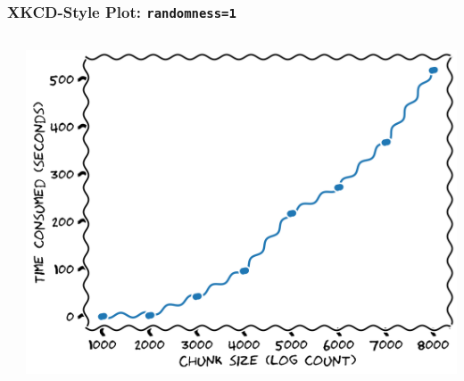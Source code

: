 \documentclass[xcolor={svgnames}]{beamer}
\newcommand{\pyfile}[2][]{}
\begin{document}
\begin{frame}[t,fragile]
    \frametitle{XKCD-Style Plot: \texttt{randomness=1}}
    \vspace{-2mm}
    \begin{columns}[T]
        \begin{column}{0.49\textwidth}
            \pyfile[style=footnotesize]{examples/xkcd-7.py}
        \end{column}
        \begin{column}{0.51\textwidth}
            \includegraphics[width=\textwidth]{img/xkcd-7.png}
        \end{column}
    \end{columns}
\end{frame}
\end{document}
